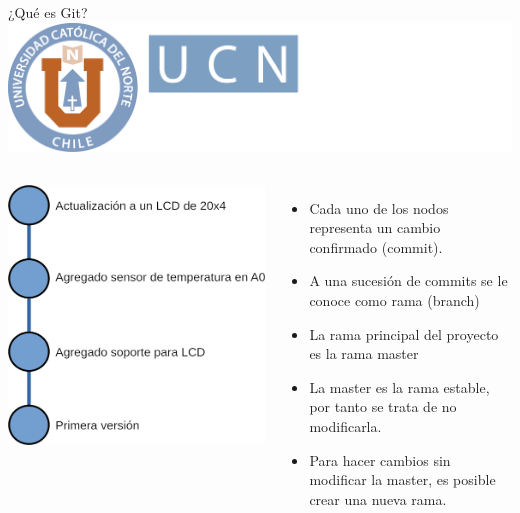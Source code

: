\documentclass[12pt,a4paper,usenames,x11names,compress]{beamer}
\begin{document}
\begin{frame}{¿Qué es Git?\hfill \includegraphics[scale=.1]{eciem.png}}
\begin{columns}
\includegraphics[scale=.23]{commit.png} 
\begin{itemize}
\justifying
 \item Cada uno de los nodos representa un cambio confirmado (commit).
 \item A una sucesión de commits se le conoce como rama (branch)
 \item La rama principal del proyecto es la rama master
 \item La master es la rama estable, por tanto se trata de no modificarla.
 \item Para hacer cambios sin modificar la master, es posible crear una nueva rama.
\end{itemize}
\end{columns}
\end{frame}
\end{document}
